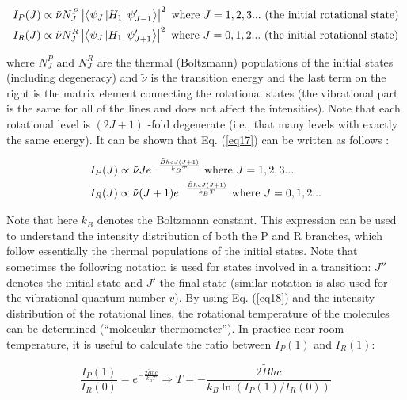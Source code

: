 \documentclass[byrevtex,amssymb,aps,pra,floatfix,letterpaper]{revtex4}
\begin{document}
\begin{align}
\label{eq17}
& I_P(J) \propto \tilde{\nu}N_J^P\left|\left<\psi_J\left|H_1\right|\psi'_{J-1}\right>\right|^2\textnormal{ where }J=1,2,3...\textnormal{ (the initial rotational state)}\\
\notag
& I_R(J) \propto \tilde{\nu}N_J^R\left|\left<\psi_J\left|H_1\right|\psi'_{J+1}\right>\right|^2\textnormal{ where }J=0,1,2...\textnormal{ (the initial rotational state)}
\notag
\end{align}

\noindent
where $N_J^P$ and $N_J^R$ are the thermal (Boltzmann) populations of the initial states (including degeneracy) and $\tilde{\nu}$ is the transition energy and the last term on the right is the matrix element connecting the rotational states (the vibrational part is the same for all of the lines and does not affect the intensities). Note that each rotational level is $(2J + 1)$ -fold degenerate (i.e., that many levels with exactly the same energy). It can be shown that Eq. (\ref{eq17}) can be written as follows \cite{HERZBERG1}:

\begin{align}
\label{eq18}
& I_P(J) \propto \tilde{\nu}Je^{-\frac{\tilde{B}hcJ(J+1)}{k_BT}}\textnormal{ where }J=1,2,3...\\
\notag
& I_R(J) \propto \tilde{\nu}(J+1)e^{-\frac{\tilde{B}hcJ(J+1)}{k_BT}}\textnormal{ where }J=0,1,2...
\end{align}

\noindent
Note that here $k_B$ denotes the Boltzmann constant. This expression can be used to understand the intensity distribution of both the P and R branches, which follow essentially the thermal populations of the initial states. Note that sometimes the following notation is used for states involved in a transition: $J''$ denotes the initial state and $J'$ the final state (similar notation is also used for the vibrational quantum number $v$). By using Eq. (\ref{eq18}) and the intensity distribution of the rotational lines, the rotational temperature of the molecules can be determined (``molecular thermometer''). In practice near room temperature, it is useful to calculate the ratio between $I_P(1)$ and $I_R(1)$:

\begin{equation}
\frac{I_P(1)}{I_R(0)} = e^{-\frac{2\tilde{B}hc}{k_BT}} \Rightarrow T = -\frac{2\tilde{B}hc}{k_B\ln\left(I_P(1)/I_R(0)\right)}
\label{eq18a}
\end{equation}
\end{document}
